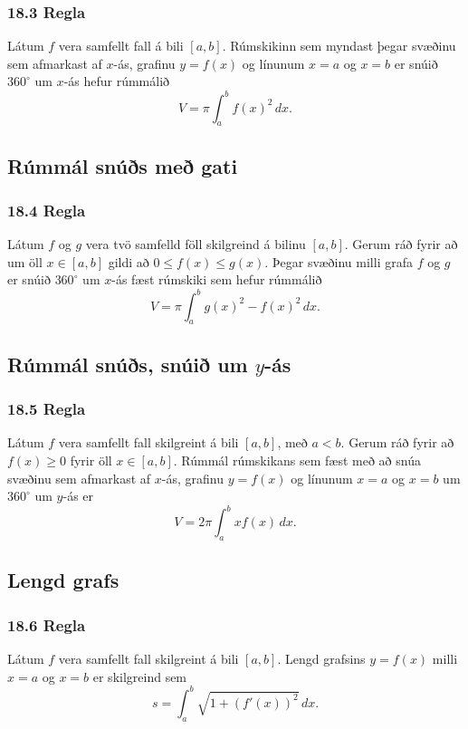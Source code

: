  \subsubsection{18.3 Regla} 
Látum $f$ vera samfellt fall á bili $[a, b]$.  Rúmskikinn sem
myndast þegar svæðinu sem afmarkast af $x$-ás, grafinu $y=f(x)$ og
línunum $x=a$ og $x=b$ er snúið $360^\circ$ um $x$-ás hefur rúmmálið 
$$V=\pi\int_a^b f(x)^2\,dx.$$



\subsection[t]{Rúmmál snúðs með gati}
 \subsubsection{18.4 Regla} 
Látum $f$ og $g$ vera tvö samfelld föll skilgreind á bilinu $[a, b]$.
Gerum ráð fyrir að um öll $x\in [a, b]$ gildi að $0\leq f(x)\leq
g(x)$.  Þegar svæðinu milli grafa $f$ og $g$  er snúið $360^\circ$ um
$x$-ás fæst rúmskiki sem hefur rúmmálið 
$$V=\pi\int_a^b g(x)^2-f(x)^2\,dx.$$



\subsection[t]{Rúmmál snúðs, snúið um $y$-ás}
 \subsubsection{18.5 Regla} 
Látum $f$ vera samfellt fall skilgreint á bili $[a, b]$, með $a<b$.
Gerum ráð fyrir að $f(x)\geq 0$ fyrir öll $x\in [a, b]$.  Rúmmál
rúmskikans sem fæst með að snúa svæðinu sem afmarkast af  $x$-ás,
grafinu $y=f(x)$ og línunum $x=a$ og $x=b$ um $360^\circ$ um $y$-ás er
$$V=2\pi\int_a^b xf(x)\,dx.$$



\subsection[t]{Lengd grafs}
 \subsubsection{18.6 Regla} 
Látum $f$ vera samfellt fall skilgreint á bili $[a, b]$.  Lengd
grafsins $y=f(x)$ milli $x=a$ og $x=b$ er skilgreind sem 
$$s=\int_a^b\sqrt{1+(f'(x))^2}\,dx.$$



